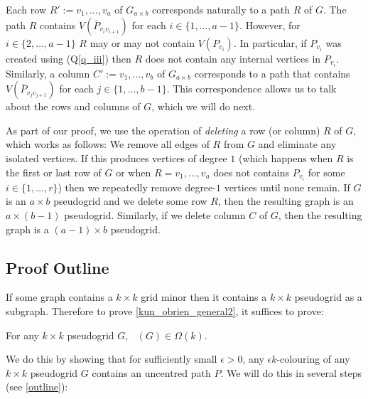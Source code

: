 \documentclass{patmorin}
\newcommand{\defin}[1]{\emph{\color{brown}#1}}
\DeclareMathOperator{\chilin}{\chi_{\mathrm{lin}}}
\begin{document}

Each row $R':=v_1,\ldots,v_a$ of $G_{a\times b}$ corresponds naturally to a path $R$ of $G$. The path $R$ contains $V(\overline{P}_{v_iv_{i+1}})$ for each $i\in\{1,\ldots,a-1\}$.  However, for $i\in\{2,\ldots,a-1\}$ $R$ may or may not contain $V(P_{v_i})$.  In particular, if $P_{v_i}$ was created using (Q\ref{q_iii}) then $R$ does not contain any internal vertices in $P_{v_i}$. Similarly, a column $C':=v_1,\ldots,v_b$ of $G_{a\times b}$ corresponds to a path that contains $V(\overline{P}_{v_jv_{j+1}})$ for each $j\in\{1,\ldots,b-1\}$. This correspondence allows us to talk about the rows and columns of $G$, which we will do next.

As part of our proof, we use the operation of \defin{deleting} a row (or column) $R$ of $G$, which works as follows:  We remove all edges of $R$ from $G$ and eliminate any isolated vertices.  If this produces vertices of degree $1$ (which happens when $R$ is the first or last row of $G$ or when $R=v_1,\ldots,v_a$ does not contains $P_{v_i}$ for some $i\in\{1,\ldots,r\}$) then we repeatedly remove degree-$1$ vertices until none remain.  If $G$ is an $a\times b$ pseudogrid and we delete some row $R$, then the resulting graph is an $a\times (b-1)$ pseudogrid.  Similarly, if we delete column $C$ of $G$, then the resulting graph is a $(a-1)\times b$ pseudogrid.

\subsection{Proof Outline}

If some graph contains a $k\times k$ grid minor then it contains a $k\times k$ pseudogrid as a subgraph.  Therefore to prove \cref{kun_obrien_general2}, it suffices to prove:

\begin{lem}\label{pseudogrid_lower_bound}
  For any $k\times k$ pseudogrid $G$, $\chilin(G)\in\Omega(k)$.
\end{lem}

We do this by showing that for sufficiently small $\epsilon >0$,  any $\epsilon k$-colouring of any $k\times k$ pseudogrid $G$ contains an uncentred path $P$. We will do this in several steps (see \cref{outline}):
\end{document}
